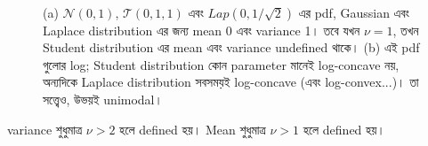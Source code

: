 \documentclass[graybox, envcountchap, twocolumn]{styles/svmult}
\begin{document}
\begin{figure}[hbtp]
\centering
{} \\
\caption{(a)  $\mathcal{N}(0,1)$, $\mathcal{T}(0,1,1)$ এবং $Lap(0,1/\sqrt{2})$ {\bengalifont এর pdf, Gaussian এবং Laplace distribution এর জন্য mean 0 এবং variance 1। তবে যখন $\nu=1$, তখন Student distribution এর mean এবং variance undefined থাকে। }(b) {\bengalifont এই pdf গুলোর log; Student distribution কোন parameter মানেই log-concave নয়, অন্যদিকে Laplace distribution সবসময়ই log-concave (এবং log-convex...)। তা সত্ত্বেও, উভয়ই unimodal।
}}

\label{fig:pdfs-for-NTL} 
\end{figure}

{\bengalifont variance শুধুমাত্র $\nu>2$ হলে defined হয়। Mean শুধুমাত্র $\nu>1$ হলে defined হয়।}
\end{document}
